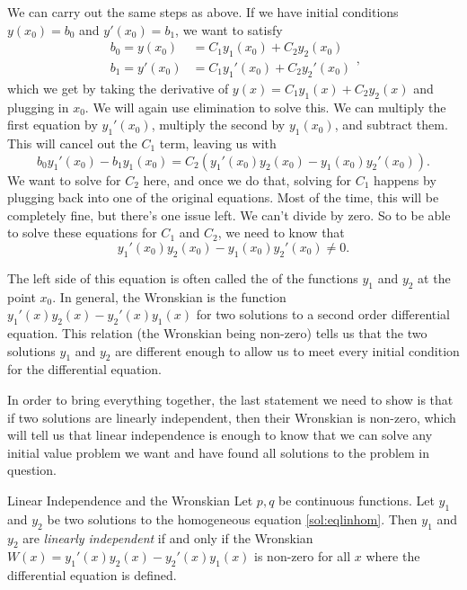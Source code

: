 We can carry out the same steps as above. If we have initial conditions $y(x_0) = b_0$ and $y'(x_0) = b_1$, we want to satisfy
\begin{equation*}
\begin{split}
b_0 = y(x_0) &= C_1y_1(x_0) + C_2y_2(x_0) \\
b_1 = y'(x_0) &= C_1y_1'(x_0)  + C_2y_2'(x_0)
\end{split},
\end{equation*}
which we get by taking the derivative of $y(x) = C_1y_1(x) + C_2y_2(x)$ and plugging in $x_0$. We will again use elimination to solve this. We can multiply the first equation by $y_1'(x_0)$, multiply the second by $y_1(x_0)$, and subtract them. This will cancel out the $C_1$ term, leaving us with 
\begin{equation*}
b_0y_1'(x_0) - b_1y_1(x_0) = C_2(y_1'(x_0)y_2(x_0) - y_1(x_0)y_2'(x_0)).
\end{equation*}
We want to solve for $C_2$ here, and once we do that, solving for $C_1$ happens by plugging back into one of the original equations. Most of the time, this will be completely fine, but there's one issue left. We can't divide by zero. So to be able to solve these equations for $C_1$ and $C_2$, we need to know that
\begin{equation}
y_1'(x_0)y_2(x_0) - y_1(x_0)y_2'(x_0) \neq 0.
\label{eqn:linindepW}
\end{equation}

The left side of this equation is often called the \emph{} of the functions $y_1$ and $y_2$ at the point $x_0$. In general, the Wronskian is the function $y_1'(x)y_2(x) - y_2'(x)y_1(x)$ for two solutions to a second order differential equation. This relation (the Wronskian being non-zero) tells us that the two solutions $y_1$ and $y_2$ are different enough to allow us to meet every initial condition for the differential equation. 

In order to bring everything together, the last statement we need to show is that if two solutions are linearly independent, then their Wronskian is non-zero, which will tell us that linear independence is enough to know that we can solve any initial value problem we want and have found all solutions to the problem in question. 

\begin{theorem1}{Linear Independence and the Wronskian}
Let $p, q$ be continuous functions. Let $y_1$ and $y_2$ be two solutions to the homogeneous equation \eqref{sol:eqlinhom}. Then $y_1$ and $y_2$ are \emph{linearly independent} if and only if the Wronskian $W(x) = y_1'(x)y_2(x) - y_2'(x)y_1(x)$ is non-zero for all $x$ where the differential equation is defined. 
\end{theorem1}

